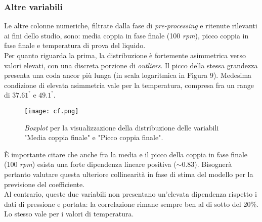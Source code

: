 \documentclass[fleqn,10pt]{SelfArx} %
\begin{document}
\subsubsection{Altre variabili}
Le altre colonne numeriche, filtrate dalla fase di \textit{pre-processing} e ritenute rilevanti ai fini dello studio, sono: media coppia in fase finale (100 \textit{rpm}), picco coppia in fase finale e temperatura di prova del liquido.\\
Per quanto riguarda la prima, la distribuzione è fortemente asimmetrica verso valori elevati, con una discreta porzione di \textit{outliers}. Il picco della stessa grandezza presenta una coda ancor più lunga (in scala logaritmica in Figura 9). Medesima condizione di elevata asimmetria vale per la temperatura, compresa fra un range di $37.61^°$ e $49.1^°$.
\begin{figure}[h]
    \centering
    \texttt{[image: cf.png]}
    \label{fig:em}
    \caption{\textit{Boxplot} per la visualizzazione della distribuzione delle variabili "Media coppia finale" e "Picco coppia finale".}
\end{figure}
È importante citare che anche fra la media e il picco della coppia in fase finale (100 \textit{rpm}) esista una forte dipendenza lineare positiva ($\sim$0.83). Bisognerà pertanto valutare questa ulteriore collinearità in fase di stima del modello per la previsione del coefficiente.\\
Al contrario, queste due variabili non presentano un'elevata dipendenza rispetto i dati di pressione e portata: la correlazione rimane sempre ben al di sotto del 20\%. Lo stesso vale per i valori di temperatura.
\end{document}
